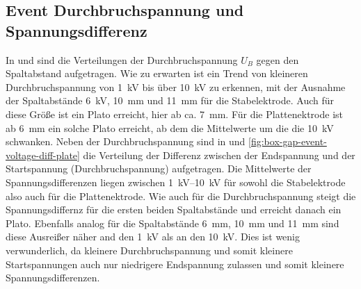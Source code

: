 \subsection{Event Durchbruchspannung und Spannungsdifferenz}
In  und  sind die Verteilungen der Durchbruchspannung \(U_B\) gegen den Spaltabstand aufgetragen. Wie zu erwarten ist ein Trend von kleineren Durchbruchspannung von \SI{1}{\kilo\volt} bis über \SI{10}{\kilo\volt} zu erkennen, mit der Ausnahme der Spaltabstände \SI{6}{\kilo\volt}, \SI{10}{\milli\meter} und \SI{11}{\milli\meter} für die Stabelektrode. Auch für diese Größe ist ein Plato erreicht, hier ab ca. \SI{7}{\milli\meter}. Für die Plattenektrode ist ab \SI{6}{\milli\meter} ein solche Plato erreicht, ab dem die Mittelwerte um die die \SI{10}{\kilo\volt} schwanken. Neben der Durchbruchspannung sind in  und \ref{fig:box-gap-event-voltage-diff-plate} die Verteilung der Differenz zwischen der Endspannung und der Startspannung (Durchbruchspannung) aufgetragen. Die Mittelwerte der Spannungsdifferenzen liegen zwischen \SIrange{1}{10}{\kilo\volt} für sowohl die Stabelektrode also auch für die Plattenektrode. Wie auch für die Durchbruchspannung steigt die Spannungsdiffernz für die ersten beiden Spaltabstände und erreicht danach ein Plato. Ebenfalls analog für die Spaltabstände \SI{6}{\milli\meter}, \SI{10}{\milli\meter} und \SI{11}{\milli\meter} sind diese Ausreißer näher and den \SI{1}{\kilo\volt} als an den \SI{10}{\kilo\volt}. Dies ist wenig verwunderlich, da kleinere Durchbruchspannung und somit kleinere Startspannungen auch nur niedrigere Endspannung zulassen und somit kleinere Spannungsdifferenzen.

